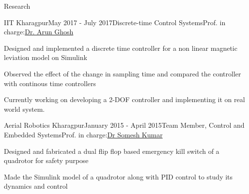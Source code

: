 \documentclass{resume} %
\begin{document}
\begin{rSection}{Research}

\begin{rSubsection}{IIT Kharagpur}{May 2017 - July 2017}{Discrete-time Control Systems}{Prof. in charge:\href{http://www.iitkgp.ac.in/department/EE/faculty/ee-arun}{Dr. Arun Ghosh}}
\item Designed and implemented a discrete time controller for a non linear magnetic leviation model on Simulink
\item Observed the effect of the change in sampling time and compared the controller with continous time controllers
\item Currently working on developing a 2-DOF controller and implementing it on real world system.
\end{rSubsection}



\begin{rSubsection}{Aerial Robotics Kharagpur}{January 2015 - April 2015}{Team Member, Control and Embedded Systems}{Prof. in charge:\href{http://www.facweb.iitkgp.ernet.in/~smsh/} {Dr Somesh Kumar}}
\item Designed and fabricated a dual flip flop based emergency kill switch of a quadrotor for safety purpose
\item Made the Simulink model of a quadrotor along with PID control to study its dynamics and control
\end{rSubsection}

\end{rSection}






\end{document}
